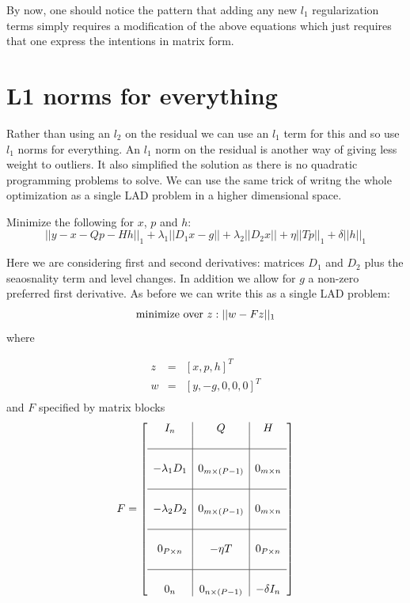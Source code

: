 \documentclass{article}
\begin{document}
By now, one should notice the pattern that adding any new $l_1$ regularization
terms simply requires a modification of the above equations which just requires
that one express the intentions in matrix form.

\section{L1 norms for everything}

Rather than using an $l_2$ on the residual we can use an $l_1$ term for this and so use
$l_1$ norms for everything. An $l_1$ norm on the residual is another way of giving less
weight to outliers. It also simplified the solution as there is no quadratic programming
problems to solve. We can use the same trick of writng the whole optimization as a single
LAD problem in a higher dimensional space.

Minimize the following for $x$, $p$ and $h$:
\begin{equation}
||y - x - Q p -H h||_1 + \lambda_1 ||D_1 x - g|| + \lambda_2 ||D_2 x||
+ \eta ||T p||_1 + \delta ||h||_1
\end{equation}

Here we are considering first and second derivatives: matrices $D_1$ and $D_2$ plus the seaosnality
term and level changes. In addition we allow for $g$ a non-zero preferred first derivative. As before
we can write this as a single LAD problem:
\[
\mbox{minimize over}~ z :  ||w-F z||_1 \\
\]
where

\begin{eqnarray}
z & = & [x, p , h]^T\\
w & = & [y, -g, 0, 0, 0]^T \\
\end{eqnarray}
and $F$ specified by matrix blocks
\begin{equation}
F=\left[
\begin{array}{c|c|c}
I_n  & Q  & H \\
&\\
\hline
&\\
-\lambda_1 D_1 & 0_{m \times (P-1)} & 0_{m \times n}\\
&\\
\hline
&\\
-\lambda_2 D_2 & 0_{m \times (P-1)} & 0_{m \times n}\\
&\\
\hline
&\\
0_{P \times n} & -\eta T & 0_{P \times n} \\
&\\
\hline
&\\
0_{n} & 0_{n \times (P-1)} & -\delta I_n
\end{array}\right]
\end{equation}
\end{document}
